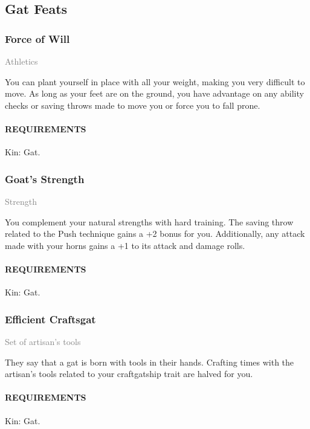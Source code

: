 \subsection*{Gat Feats}
    \subsubsection{Force of Will} \label{feat::forceofwill}
    \small{\textcolor{gray}{Athletics}}

    \normalsize
    You can plant yourself in place with all your weight, making you very difficult to move.
    As long as your feet are on the ground, you have advantage on any ability checks or saving throws made to move you or force you to fall prone.
    \paragraph{REQUIREMENTS} Kin: Gat.

    \subsubsection{Goat's Strength} \label{feat::goatsstrength}
    \small{\textcolor{gray}{Strength}}

    \normalsize
    You complement your natural strengths with hard training.
    The saving throw related to the Push technique gains a +2 bonus for you.
    Additionally, any attack made with your horns gains a +1 to its attack and damage rolls.
    \paragraph{REQUIREMENTS} Kin: Gat.

    \subsubsection{Efficient Craftsgat} \label{feat::efficientcraftsgat}
    \small{\textcolor{gray}{Set of artisan's tools}}

    \normalsize
    They say that a gat is born with tools in their hands.
    Crafting times with the artisan's tools related to your craftgatship trait are halved for you.
    \paragraph{REQUIREMENTS} Kin: Gat.

